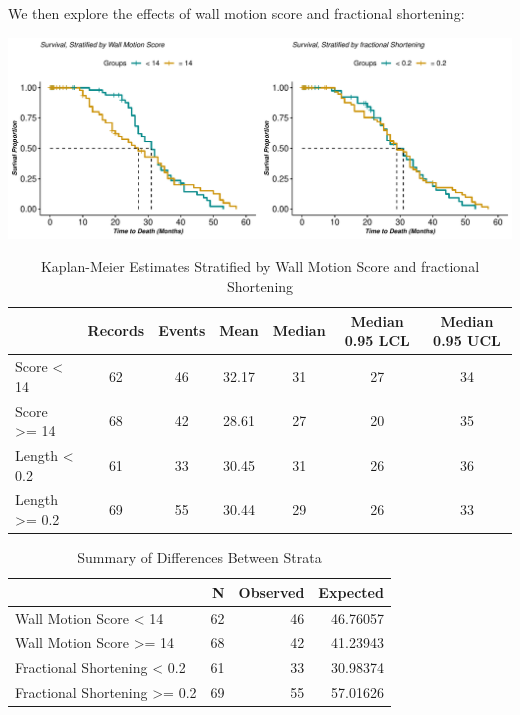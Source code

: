 \documentclass[
]{article}
\begin{document}
We then explore the effects of wall motion score and fractional
shortening:

\begin{center}\includegraphics{markdown_files/figure-latex/km.wms.fshort-1} \end{center}

\begin{table}[!h]

\caption{\label{tab:ks4}Kaplan-Meier Estimates Stratified by Wall Motion Score and fractional Shortening}
\centering
\begin{tabular}[t]{l|c|c|c|c|c|c}
\hline
  & Records & Events & Mean & Median & Median 0.95 LCL & Median 0.95 UCL\\
\hline
Score < 14 & 62 & 46 & 32.17 & 31 & 27 & 34\\
\hline
Score >= 14 & 68 & 42 & 28.61 & 27 & 20 & 35\\
\hline
Length < 0.2 & 61 & 33 & 30.45 & 31 & 26 & 36\\
\hline
Length >= 0.2 & 69 & 55 & 30.44 & 29 & 26 & 33\\
\hline
\end{tabular}
\end{table}

\begin{table}

\caption{\label{tab:ks4.5.survdiff}Summary of Differences Between Strata}
\centering
\begin{tabular}[t]{l|r|r|r}
\hline
  & N & Observed & Expected\\
\hline
Wall Motion Score < 14 & 62 & 46 & 46.76057\\
\hline
Wall Motion Score >= 14 & 68 & 42 & 41.23943\\
\hline
Fractional Shortening < 0.2 & 61 & 33 & 30.98374\\
\hline
Fractional Shortening >= 0.2 & 69 & 55 & 57.01626\\
\hline
\end{tabular}
\end{table}
\end{document}
